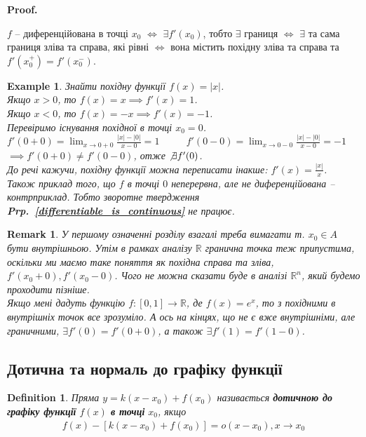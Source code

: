 \documentclass[a4paper, 14pt]{article}
\makeatletter
\def\qed{$\blacksquare$}
\theoremstyle{theoremdd}
\theoremstyle{theoremdd}
\newtheorem{definition}[theorem]{Definition}
\theoremstyle{theoremdd}
\theoremstyle{theoremdd}
\newtheorem{example}[theorem]{Example}
\theoremstyle{theoremdd}
\theoremstyle{theoremdd}
\newtheorem{remark}[theorem]{Remark}
\theoremstyle{theoremdd}
\theoremstyle{theoremdd}
\renewenvironment{proof}[1][Proof.\\]{\par
\pushQED{\hfill \qed}%
\normalfont \topsep6\p@\@plus6\p@\relax
\trivlist
\item\relax
{\bfseries
#1\@addpunct{.}}\hspace\labelsep\ignorespaces
}{%
\popQED\endtrivlist\@endpefalse
}
\newcommand\prpref[1]{\textbf{Prp.~\ref{#1}}}
\makeatother
\begin{document}
\begin{proof}
$f$ -- диференційована в точці $x_0$ $\iff$ $\exists f'(x_0)$, тобто $\exists$ границя $\iff$ $\exists$ та сама границя зліва та справа, які рівні $\iff$ вона містить похідну зліва та справа та $f'(x_0^+) = f'(x_0^-)$.
\end{proof}

\begin{example}
Знайти похідну функції $f(x) = |x|$.\\
Якщо $x>0$, то $f(x) = x \implies f'(x) = 1$.\\
Якщо $x<0$, то $f(x) = -x \implies f'(x) = -1$.\\
Перевіримо існування похідної в точці $x_0 = 0$.\\
$f'(0+0) = \displaystyle \lim_{x \to 0+0} \frac{|x|-|0|}{x-0} = 1 \hspace{1cm}$
$f'(0-0) = \displaystyle \lim_{x \to 0-0} \frac{|x|-|0|}{x-0} = -1$\\
$\implies f'(0+0) \neq f'(0-0)$, отже $\not \exists f'(0)$. \\ До речі кажучи, похідну функції можна переписати інакше: $f'(x) = \displaystyle \frac{|x|}{x}$.\\
Також приклад того, що $f$ в точці $0$ неперервна, але не диференційована -- контрприклад. Тобто зворотне твердження \prpref{differentiable_is_continuous} не працює.
\end{example}

\begin{remark}
У першому означенні розділу взагалі треба вимагати т. $x_0 \in A$ бути внутрішньою. Утім в рамках аналізу $\mathbb{R}$ гранична точка теж припустима, оскільки ми маємо таке поняття як похідна справа та зліва, $f'(x_0+0),f'(x_0-0)$. Чого не можна сказати буде в аналізі $\mathbb{R}^n$, який будемо проходити пізніше.\\
Якщо мені дадуть функцію $f: [0,1] \to \mathbb{R}$, де $f(x) = e^x$, то з похідними в внутрішніх точок все зрозуміло. А ось на кінцях, що не є вже внутрішніми, але граничними, $\exists f'(0) = f'(0+0)$, а також $\exists f'(1) = f'(1-0)$.
\end{remark}

\subsection{Дотична та нормаль до графіку функції}
\begin{definition}
Пряма $y = k (x-x_0) + f(x_0)$ називається \textbf{дотичною до графіку функції} $f(x)$ \textbf{в точці} $x_0$, якщо
\begin{align*}
f(x) - [k(x-x_0)+f(x_0)] = o(x-x_0), x\to x_0
\end{align*}
\end{definition}
\end{document}
